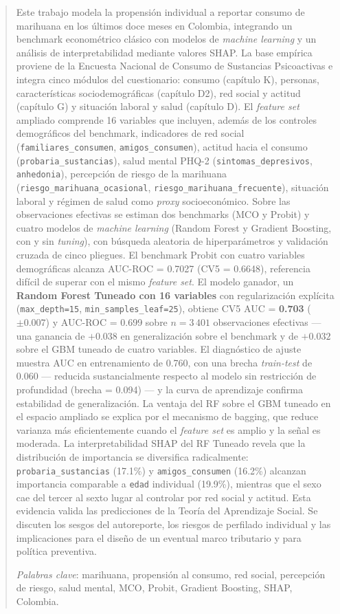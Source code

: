 \documentclass[12pt, a4paper]{article}
\begin{document}
\begin{abstract}
Este trabajo modela la propensión individual a reportar consumo de marihuana en los últimos doce meses en Colombia, integrando un benchmark econométrico clásico con modelos de \textit{machine learning} y un análisis de interpretabilidad mediante valores SHAP. La base empírica proviene de la Encuesta Nacional de Consumo de Sustancias Psicoactivas e integra cinco módulos del cuestionario: consumo (capítulo K), personas, características sociodemográficas (capítulo D2), red social y actitud (capítulo G) y situación laboral y salud (capítulo D). El \textit{feature set} ampliado comprende 16 variables que incluyen, además de los controles demográficos del benchmark, indicadores de red social (\texttt{familiares\_consumen}, \texttt{amigos\_consumen}), actitud hacia el consumo (\texttt{probaria\_sustancias}), salud mental PHQ-2 (\texttt{sintomas\_depresivos}, \texttt{anhedonia}), percepción de riesgo de la marihuana (\texttt{riesgo\_marihuana\_ocasional}, \texttt{riesgo\_marihuana\_frecuente}), situación laboral y régimen de salud como \textit{proxy} socioeconómico. Sobre las observaciones efectivas se estiman dos benchmarks (MCO y Probit) y cuatro modelos de \textit{machine learning} (Random Forest y Gradient Boosting, con y sin \textit{tuning}), con búsqueda aleatoria de hiperparámetros y validación cruzada de cinco pliegues. El benchmark Probit con cuatro variables demográficas alcanza AUC-ROC = 0.7027 (CV5 = 0.6648), referencia difícil de superar con el mismo \textit{feature set}. El modelo ganador, un \textbf{Random Forest Tuneado con 16 variables} con regularización explícita (\texttt{max\_depth=15}, \texttt{min\_samples\_leaf=25}), obtiene CV5 AUC = \textbf{0.703} ($\pm 0.007$) y AUC-ROC = 0.699 sobre $n = 3\,401$ observaciones efectivas — una ganancia de $+0.038$ en generalización sobre el benchmark y de $+0.032$ sobre el GBM tuneado de cuatro variables. El diagnóstico de ajuste muestra AUC en entrenamiento de 0.760, con una brecha \textit{train-test} de 0.060 — reducida sustancialmente respecto al modelo sin restricción de profundidad (brecha = 0.094) — y la curva de aprendizaje confirma estabilidad de generalización. La ventaja del RF sobre el GBM tuneado en el espacio ampliado se explica por el mecanismo de bagging, que reduce varianza más eficientemente cuando el \textit{feature set} es amplio y la señal es moderada. La interpretabilidad SHAP del RF Tuneado revela que la distribución de importancia se diversifica radicalmente: \texttt{probaria\_sustancias} (17.1\%) y \texttt{amigos\_consumen} (16.2\%) alcanzan importancia comparable a \texttt{edad} individual (19.9\%), mientras que el sexo cae del tercer al sexto lugar al controlar por red social y actitud. Esta evidencia valida las predicciones de la Teoría del Aprendizaje Social. Se discuten los sesgos del autoreporte, los riesgos de perfilado individual y las implicaciones para el diseño de un eventual marco tributario y para política preventiva.

\textit{Palabras clave}: marihuana, propensión al consumo, red social, percepción de riesgo, salud mental, MCO, Probit, Gradient Boosting, SHAP, Colombia.
\end{abstract}
\end{document}
